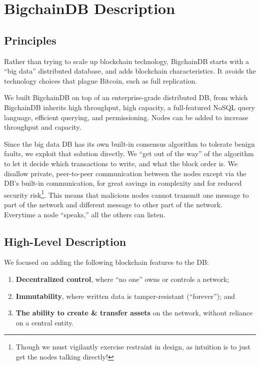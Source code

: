 \section{BigchainDB Description}\label{sec:bigchaindb}

\subsection{Principles}
Rather than trying to scale up blockchain technology, BigchainDB starts with a “big data” distributed database, and adds blockchain characteristics.
It avoids the technology choices that plague Bitcoin, such as full replication.

We built BigchainDB on top of an enterprise-grade distributed DB, from which BigchainDB inherits high throughput, high capacity, a full-featured NoSQL query language, efficient querying, and permissioning. Nodes can be added to increase throughput and capacity.

Since the big data DB has its own built-in consensus algorithm to tolerate benign faults, we exploit that solution directly.
We “get out of the way” of the algorithm to let it decide which transactions to write, and what the block order is.
We disallow private, peer-to-peer communication between the nodes except via the DB’s built-in communication, for great savings in complexity and for reduced security risk\footnote{Though we must vigilantly exercise restraint in design, as intuition is to just get the nodes talking directly!}.
This means that malicious nodes cannot transmit one message to part of the network and different message to other part of the network. Everytime a node ``speaks,'' all the others can listen.

\subsection{High-Level Description}
We focused on adding the following blockchain features to the DB:
\begin{enumerate}
 \item \textbf{Decentralized control}, where “no one” owns or controls a network;
 \item \textbf{Immutability}, where written data is tamper-resistant (“forever”); and
 \item \textbf{The ability to create \& transfer assets} on the network, without reliance on a central entity.
\end{enumerate}

